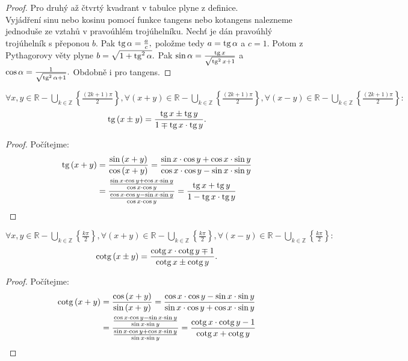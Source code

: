 \begin{proof}
    Pro druhý až čtvrtý kvadrant v tabulce plyne z definice. \\
    Vyjádření sinu nebo kosinu pomocí funkce tangens nebo kotangens nalezneme
    jednoduše ze vztahů v pravoúhlém trojúhelníku. Nechť je dán pravoúhlý trojúhelník
    s přeponou $b.$ Pak $\operatorname{tg} \alpha = \frac{a}{c},$ položme tedy $a = \operatorname{tg} \alpha$ a $c=1. $
    Potom z Pythagorovy věty plyne $b=\sqrt{1+\operatorname{tg}^2 \alpha}. $ Pak $\sin\alpha = \frac{\operatorname{tg} x}{\sqrt{\operatorname{tg}^2 x+1} }$ a
    $\cos \alpha = \frac{1}{\sqrt{\operatorname{tg}^2 \alpha + 1} }.$ Obdobně i pro tangens.
\end{proof}

\begin{veta}
  $\forall x,y\in\mathbb{R}-\bigcup\limits_{k\in\mathbb{Z}} \left\{\frac{(2k+1)\pi}{2}\right\}, \forall (x+y) \in \mathbb{R}-\bigcup\limits_{k\in\mathbb{Z}} \left\{\frac{(2k+1)\pi}{2}\right\}, \forall (x-y) \in \mathbb{R}-\bigcup\limits_{k\in\mathbb{Z}} \left\{\frac{(2k+1)\pi}{2}\right\}:$
  $$\operatorname{tg}\left(x\pm y\right) = \frac{\operatorname{tg} x \pm \operatorname{tg} y}{1\mp\operatorname{tg} x \cdot \operatorname{tg} y}.$$
\end{veta}
\begin{proof}
    Počítejme:
    \begin{align*}
        \operatorname{tg} \left(x+y\right) & = \frac{\sin \left(x+y\right)}{\cos \left(x+y\right)}=\frac{\sin x\cdot  \cos y + \cos x\cdot  \sin y}{\cos x \cdot \cos y - \sin x\cdot  \sin y} \\
        & = \frac{\frac{\sin x \cdot \cos y + \cos x\cdot  \sin y}{\cos x \cdot \cos y}}{\frac{\cos x\cdot  \cos y - \sin x \cdot \sin y}{\cos x\cdot  \cos y}}=\frac{\operatorname{tg} x + \operatorname{tg} y}{1-\operatorname{tg} x \cdot \operatorname{tg} y}\qedhere
    \end{align*}
\end{proof}


\begin{veta}
  $\forall x,y\in\mathbb{R}-\bigcup\limits_{k\in\mathbb{Z}} \left\{\frac{k\pi}{2}\right\}, \forall (x+y) \in \mathbb{R}-\bigcup\limits_{k\in\mathbb{Z}} \left\{\frac{k\pi}{2}\right\}, \forall (x-y) \in \mathbb{R}-\bigcup\limits_{k\in\mathbb{Z}} \left\{\frac{k\pi}{2}\right\}:$
  $$\operatorname{cotg}\left(x\pm y\right) = \frac{\operatorname{cotg} x \cdot \operatorname{cotg} y \mp 1}{\operatorname{cotg} x \pm \operatorname{cotg} y}.$$
\end{veta}

\begin{proof}
    Počítejme:
    \begin{align*}
        \operatorname{cotg} \left(x+y\right) & = \frac{\cos \left(x+y\right)}{\sin \left(x+y\right)}=\frac{\cos x \cdot \cos y - \sin x\cdot  \sin y}{\sin x\cdot  \cos y + \cos x\cdot  \sin y}\\
       &  = \frac{\frac{\cos x\cdot  \cos y - \sin x \cdot \sin y}{\sin x \cdot \sin y}}{\frac{\sin x \cdot \cos y + \cos x\cdot  \sin y}{\sin x\cdot  \sin y}}=\frac{\operatorname{cotg} x \cdot \operatorname{cotg} y-1}{\operatorname{cotg} x + \operatorname{cotg} y}\qedhere
    \end{align*}
\end{proof}

